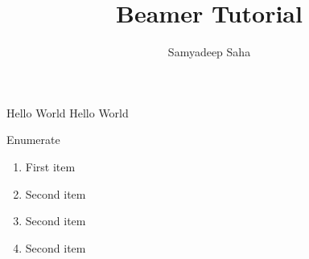 \documentclass{beamer}
\title{Beamer Tutorial}
\author{Samyadeep Saha}
\date{}
\begin{document}
\begin{frame}
\titlepage
\end{frame}

\begin{frame}{Hello World}
Hello World
\end{frame}

\begin{frame}{Enumerate}
\begin{enumerate}
    \item First item \pause
    \item Second item \pause
    \item Second item \pause
    \item Second item \pause
\end{enumerate}
\end{frame}
\end{document}
